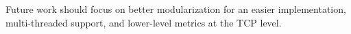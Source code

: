 \documentclass[conference]{IEEEtran}
\begin{document}
Future work should focus on better modularization for an easier implementation, multi-threaded support, and lower-level metrics at the TCP level. 



%
%
%





\end{document}
